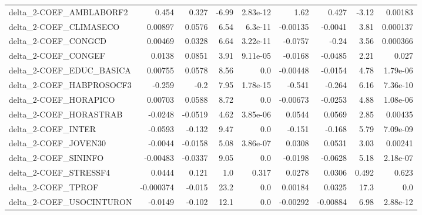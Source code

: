 \begin{tabular}{lrrrrrrrr}
delta\_2-COEF\_AMBLABORF2                &       0.454 &        0.327 &    -6.99 & 2.83e-12 &       1.62 &       0.427 &        -3.12 &       0.00183 \\
delta\_2-COEF\_CLIMASECO                 &     0.00897 &       0.0576 &     6.54 &  6.3e-11 &   -0.00135 &     -0.0041 &         3.81 &      0.000137 \\
delta\_2-COEF\_CONGCD                    &     0.00469 &       0.0328 &     6.64 & 3.22e-11 &    -0.0757 &       -0.24 &         3.56 &      0.000366 \\
delta\_2-COEF\_CONGEF                    &      0.0138 &       0.0851 &     3.91 & 9.11e-05 &    -0.0168 &     -0.0485 &         2.21 &         0.027 \\
delta\_2-COEF\_EDUC\_BASICA               &     0.00755 &       0.0578 &     8.56 &      0.0 &   -0.00448 &     -0.0154 &         4.78 &      1.79e-06 \\
delta\_2-COEF\_HABPROSOCF3               &      -0.259 &         -0.2 &     7.95 & 1.78e-15 &     -0.541 &      -0.264 &         6.16 &      7.36e-10 \\
delta\_2-COEF\_HORAPICO                  &     0.00703 &       0.0588 &     8.72 &      0.0 &   -0.00673 &     -0.0253 &         4.88 &      1.08e-06 \\
delta\_2-COEF\_HORASTRAB                 &     -0.0248 &      -0.0519 &     4.62 & 3.85e-06 &     0.0544 &      0.0569 &         2.85 &       0.00435 \\
delta\_2-COEF\_INTER                     &     -0.0593 &       -0.132 &     9.47 &      0.0 &     -0.151 &      -0.168 &         5.79 &      7.09e-09 \\
delta\_2-COEF\_JOVEN30                   &     -0.0044 &      -0.0158 &     5.08 & 3.86e-07 &     0.0308 &      0.0531 &         3.03 &       0.00241 \\
delta\_2-COEF\_SININFO                   &    -0.00483 &      -0.0337 &     9.05 &      0.0 &    -0.0198 &     -0.0628 &         5.18 &      2.18e-07 \\
delta\_2-COEF\_STRESSF4                  &      0.0444 &        0.121 &      1.0 &    0.317 &     0.0278 &      0.0306 &        0.492 &         0.623 \\
delta\_2-COEF\_TPROF                     &   -0.000374 &       -0.015 &     23.2 &      0.0 &    0.00184 &      0.0325 &         17.3 &           0.0 \\
delta\_2-COEF\_USOCINTURON               &     -0.0149 &       -0.102 &     12.1 &      0.0 &   -0.00292 &    -0.00884 &         6.98 &      2.88e-12 \\

\end{tabular}
